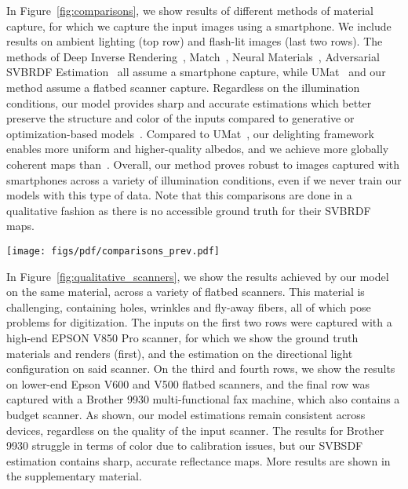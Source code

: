 In Figure~\ref{fig:comparisons}, we show results of different methods of material capture, for which we capture the input images using a smartphone. We include results on ambient lighting (top row) and flash-lit images (last two rows). The methods of Deep Inverse Rendering~\cite{gao2019deep}, Match~\cite{shi2020match}, Neural Materials~\cite{henzler2021neuralmaterial}, Adversarial SVBRDF Estimation~\cite{zhou2021adversarial} all assume a smartphone capture, while UMat~\cite{rodriguezpardo2023UMat} and our method assume a flatbed scanner capture. Regardless on the illumination conditions, our model provides sharp and accurate estimations which better preserve the structure and color of the inputs compared to generative or optimization-based models~\cite{gao2019deep, shi2020match, henzler2021neuralmaterial}. Compared to UMat~\cite{rodriguezpardo2023UMat}, our delighting framework enables more uniform and higher-quality albedos, and we achieve more globally coherent maps than~\cite{zhou2021adversarial}. Overall, our method proves robust to images captured with smartphones across a variety of illumination conditions, even if we never train our models with this type of data. Note that this comparisons are done in a qualitative fashion as there is no accessible ground truth for their SVBRDF maps.

\begin{figure*}[tb!]
	\centering
	\texttt{[image: figs/pdf/comparisons\_prev.pdf]}
	\caption{Comparisons of our method with previous work on images captured with a smartphone, using ambient lighting (top row) and flash illumination (bottom two rows), at different levels of resolution. From left to right, we show input images, and the results of Deep Inverse Rendering~\cite{gao2019deep}, Match~\cite{shi2020match}, Neural Materials~\cite{henzler2021neuralmaterial}, Adversarial SVBRDF Estimation~\cite{zhou2021adversarial}, UMat~\cite{rodriguezpardo2023UMat}, and ours. Note that we only show the four reflectance maps used by every method: albedo, normals, specular and roughness.}
	\label{fig:comparisons}
\end{figure*}



In Figure~\ref{fig:qualitative_scanners}, we show the results achieved by our model on the same material, across a variety of flatbed scanners. This material is challenging, containing holes, wrinkles and fly-away fibers, all of which pose problems for digitization. The inputs on the first two rows were captured with a high-end EPSON V850 Pro scanner, for which we show the ground truth materials and renders (first), and the estimation on the directional light configuration on said scanner. On the third and fourth rows, we show the results on lower-end Epson V600 and V500 flatbed scanners, and the final row was captured with a Brother 9930 multi-functional fax machine, which also contains a budget scanner. As shown, our model estimations remain consistent across devices, regardless on the quality of the input scanner. The results for Brother 9930 struggle in terms of color due to calibration issues, but our SVBSDF estimation contains sharp, accurate reflectance maps. More results are shown in the supplementary material. 


